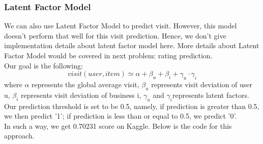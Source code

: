 \documentclass[a4paper]{article}
\begin{document}
\subsubsection{Latent Factor Model}
We can also use Latent Factor Model to predict visit. However, this model doesn't perform that well for this visit prediction. Hence, we don't give implementation details about latent factor model here. More details about Latent Factor Model would be covered in next problem: rating prediction.\\
Our goal is the following:
\begin{equation}
visit(user, item) \simeq \alpha + \beta_{u} + \beta_{i} + \gamma_{u} \cdot \gamma_{i}
\end{equation}
where $\alpha$ represents the global average visit, $\beta_{u}$ represents visit deviation of user u, $\beta_{i}$ represents visit deviation of business i, $\gamma_{u}$ and $\gamma_{i}$represents latent factors.\\
Our prediction threshold is set to be 0.5, namely, if prediction is greater than 0.5, we then predict '1'; if prediction is less than or equal to 0.5, we predict '0'.\\
In such a way, we get 0.70231 score on Kaggle. Below is the code for this approach.\\
\end{document}

